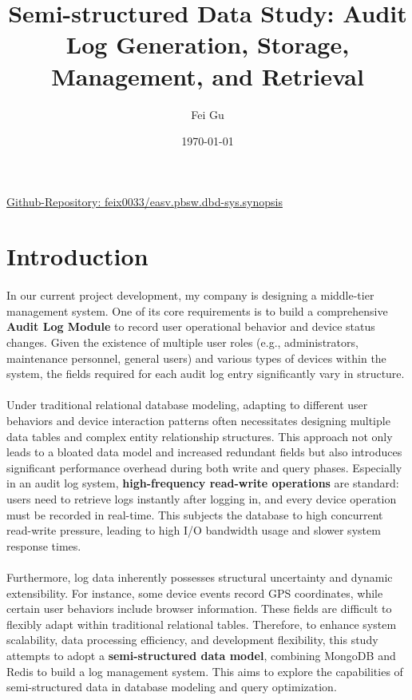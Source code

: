 \documentclass{article}
\title{Semi-structured Data Study: Audit Log Generation, Storage, Management, and Retrieval}
\author{Fei Gu}
\date{\today}
\begin{document}
\maketitle
\href{https://github.com/feix0033/easv.pbsw.dbd-sys.synopsis}{Github-Repository: feix0033/easv.pbsw.dbd-sys.synopsis}

\section{Introduction}

\paragraph{} In our current project development, my company is designing a middle-tier management system. One of its core requirements is to build a comprehensive \textbf{Audit Log Module} to record user operational behavior and device status changes. Given the existence of multiple user roles (e.g., administrators, maintenance personnel, general users) and various types of devices within the system, the fields required for each audit log entry significantly vary in structure.

\paragraph{} Under traditional relational database modeling, adapting to different user behaviors and device interaction patterns often necessitates designing multiple data tables and complex entity relationship structures. This approach not only leads to a bloated data model and increased redundant fields but also introduces significant performance overhead during both write and query phases. Especially in an audit log system, \textbf{high-frequency read-write operations} are standard: users need to retrieve logs instantly after logging in, and every device operation must be recorded in real-time. This subjects the database to high concurrent read-write pressure, leading to high I/O bandwidth usage and slower system response times.

\paragraph{} Furthermore, log data inherently possesses structural uncertainty and dynamic extensibility. For instance, some device events record GPS coordinates, while certain user behaviors include browser information. These fields are difficult to flexibly adapt within traditional relational tables. Therefore, to enhance system scalability, data processing efficiency, and development flexibility, this study attempts to adopt a \textbf{semi-structured data model}, combining MongoDB and Redis to build a log management system. This aims to explore the capabilities of semi-structured data in database modeling and query optimization.
\end{document}
